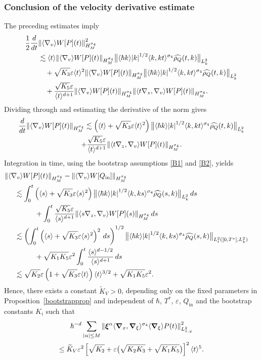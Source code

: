 \documentclass[JEP,XML,SOM,Unicode]{cedram}
\newcommand{\bnorm}[1]{\bigl\|#1\bigr\|}
\theoremstyle{plain}
\theoremstyle{remark}
\newcommand{\br}[1]{\left(#1\right)}
\newcommand{\bbr}[1]{\bigl(#1 \bigr)}
\newcommand{\ak}{\abs{k}}
\newcommand{\aal}{\abs{\alpha}}
\newcommand{\sbr}[1]{\left[#1\right]}
\newcommand{\half}{\frac{1}{2}}
\newcommand{\jb}[1]{\langle#1\rangle}
\newcommand{\ep}{\varepsilon}
\newcommand{\Qin}{Q_{\mathrm{in}}}
\begin{document}
\subsubsection{Conclusion of the velocity derivative estimate}\label{concluvelocity}
The preceding estimates imply
\begin{align*}
\half\frac{d}{dt}&\norm{\jb{\nabla_v}{W[P]}(t)}_{H^{\sigma_4}_M}^2\\
&\lesssim\jb{t}\norm{\jb{\nabla_v}{W[P](t)}}_{H^{\sigma_4}_M}\bnorm{\jb{\hbar k}\ak^{1/2}\jb{k,kt}^{\sigma_4}\widehat{\rho_Q}(t,k)}_{L^2_{k}}\\
&\quad+\sqrt{K_3}\ep\jb{t}^2\norm{\jb{\nabla_v}W[P](t)}_{H^{\sigma_4}_M}\bnorm{\jb{\hbar k}\ak^{1/2}\jb{k,kt}^{\sigma_4}\widehat{\rho_Q}(t,k)}_{L^2_k}\\
&\quad+\frac{\sqrt{K_5}\ep}{\jb{t}^{d+1}}\norm{\jb{\nabla_v}W[P](t)}_{H^{\sigma_4}_M}\norm{\jb{t\nabla_z,\nabla_v}W[P](t)}_{H^{\sigma_4}_M}.
\end{align*}
Dividing through and estimating the derivative of the norm gives
\begin{multline*}
\frac{d}{dt}\norm{\jb{\nabla_v}W[P](t)}_{H^{\sigma_4}_M}\lesssim\br{\jb{t}+\sqrt{K_3}\ep\jb{t}^2}\bnorm{\jb{\hbar k}\ak^{1/2}\jb{k,kt}^{\sigma_4}\widehat{\rho_Q}(t,k)}_{L^2_{k}}\\
+\frac{\sqrt{K_5}\ep}{\jb{t}^{d+1}}\norm{\jb{t\nabla_z,\nabla_v}W[P](t)}_{H^{\sigma_4}_M}.
\end{multline*}
Integration in time, using the bootstrap assumptions \eqref{B1} and \eqref{B2}, yields
\begin{align*}
&\hspace{-0.5cm}\norm{\jb{\nabla_v}W[P](t)}_{H^{\sigma_4}_M}-\norm{\jb{\nabla_v}W[\Qin]}_{H^{\sigma_4}_M}\\
&\lesssim\int_0^t\br{\jb{s}+\sqrt{K_3}\ep\jb{s}^2}\bnorm{\jb{\hbar k}\ak^{1/2}\jb{k,ks}^{\sigma_4}\widehat{\rho_Q}(s,k)}_{L^2_{k}}\,ds\\
&\hspace{1cm}+\int_0^t\frac{\sqrt{K_5}\ep}{\jb{s}^{d+1}}\norm{\jb{s\nabla_z,\nabla_v}W[P](s)}_{H^{\sigma_4}_M}\,ds\\
&\lesssim\br{\int_0^t\br{\jb{s}+\sqrt{K_3}\ep\jb{s}^2}^2\,ds}^{1/2}\bnorm{\jb{\hbar k}\ak^{1/2}\jb{k,ks}^{\sigma_4}\widehat{\rho_Q}(s,k)}_{L^2_{t}([0,T^*],L^2_k)}\\
&\hspace{1cm}+\sqrt{K_1K_5}\ep^2\int_0^t\frac{\jb{s}^{d-1/2}}{\jb{s}^{d+1}}\,ds\\
&\lesssim\sqrt{K_2}\ep\br{1+\sqrt{K_3}\ep\jb{t}}\jb{t}^{3/2}+\sqrt{K_1K_5}\ep^2.
\end{align*}
Hence, there exists a constant $\widetilde K_V>0$, depending only on the fixed parameters in Proposition~\ref{bootstrapprop} and independent of $\hbar$, $T^*$, $\ep$, $\Qin$ and the bootstrap constants $K_i$ such that
\begin{multline}
\hbar^{-d}\sum_{\aal\leq M}\norm{\bm{\xi}^\alpha\jb{\bm{\nabla}_x,\bm{\nabla}_\xi}^{\sigma_4}\jb{\bm{\nabla}_\xi}P(t)}_{L^2_{x,y}}^2\\
\leq \widetilde K_V\ep^2\sbr{\sqrt{K_2}+\ep\bbr{\sqrt{K_2K_3}+\sqrt{K_1K_5}}}^2\jb{t}^{5}.\label{B1vconc}
\end{multline}
\end{document}
